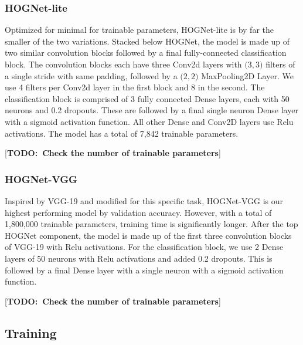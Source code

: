 \documentclass{article}
\newcommand{\todo}[1]{ {\color{red}[{\bf TODO:~{#1}}]}}
\begin{document}
\subsubsection{\label{sec:level3}HOGNet-lite}
Optimized for minimal for trainable parameters, HOGNet-lite is by far the smaller of the two variations.
Stacked below HOGNet, the model is made up of two similar convolution blocks followed by a final fully-connected classification block. The convolution blocks each have three Conv2d layers with \( \big(3,  3\big)\) filters of a single stride with same padding, followed by a \( \big(2, 2\big)\) MaxPooling2D Layer. We use 4 filters per Conv2d layer in the first block and  8 in the second. The classification block is comprised of 3 fully connected Dense layers, each with 50 neurons and 0.2 dropouts. These are followed by a final single neuron Dense layer with a sigmoid activation function. All other Dense and Conv2D layers use Relu activations. The model has a total of 7,842 trainable parameters.   

\todo{Check the number of trainable parameters}

\subsubsection{\label{sec:level3}HOGNet-VGG}
Inspired by VGG-19 and modified for this specific task, HOGNet-VGG is our highest performing model by validation accuracy. However, with a total of 1,800,000 trainable parameters, training time is significantly longer. After the top HOGNet component, the model is made up of the first three convolution blocks of VGG-19 with Relu activations. For the classification block, we use 2 Dense layers of 50 neurons with Relu activations and added 0.2 dropouts. This is followed by a final Dense layer with a single neuron with a sigmoid activation function.

\todo{Check the number of trainable parameters}

\subsection{\label{sec:level2}Training}
\end{document}
